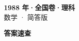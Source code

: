 \documentclass[zihao=-4, a4paper]{ctexart}
\begin{document}
\begin{center}
  {\Large\bfseries 1988 年·全国卷·理科}\\[4pt]
  {\large 数学 · 简答版}
\end{center}
\medskip
{}

\clearpage
{}
\begin{center}{\Large\bfseries 答案速查}\end{center}
\medskip

\end{document}
